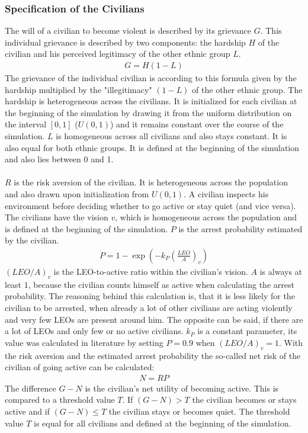 \documentclass[11pt]{article}
\begin{document}
\subsubsection{Specification of the Civilians}
The will of a civilian to become violent is described by its grievance $G$. This individual grievance is described by two components: the hardship $H$ of the civilian and his perceived legitimacy of the other ethnic group $L$.
\begin{align}
G = H (1 - L)
\end{align}
The grievance of the individual civilian is according to this formula given by the hardship multiplied by the "illegitimacy" $(1 - L)$ of the other ethnic group. The hardship is heterogeneous across the civilians. It is initialized for each civilian at the beginning of the simulation by drawing it from the uniform distribution on the interval $[0,1]$ ($U(0,1)$) and it remains constant over the course of the simulation. $L$ is homogeneous across all civilians and also stays constant. It is also equal for both ethnic groups. It is defined at the beginning of the simulation and also lies between 0 and 1.\\
\\
$R$ is the risk aversion of the civilian. It is heterogeneous across the population and also drawn upon initialization from $U(0,1)$. A civilian inspects his environment before deciding whether to go active or stay quiet (and vice versa). The civilians have the vision $v$, which is homogeneous across the population and is defined at the beginning of the simulation. $P$ is the arrest probability estimated by the civilian.
\begin{align}
P = 1 - \exp \left( - k_P \left( \frac{LEO}{A} \right)_v \right)
\end{align}
$\left(LEO/A\right)_v$ is the LEO-to-active ratio within the civilian's vision. $A$ is always at least $1$, because the civilian counts himself as active when calculating the arrest probability. The reasoning behind this calculation is, that it is less likely for the civilian to be arrested, when already a lot of other civilians are acting violently and very few LEOs are present around him. The opposite can be said, if there are a lot of LEOs and only few or no active civilians. $k_P$ is a constant parameter, its value was calculated in literature by setting $P = 0.9$ when $\left(LEO/A\right)_v = 1$. With the risk aversion and the estimated arrest probability the so-called net risk of the civilian of going active can be calculated:
\begin{align}
N = RP
\end{align}
The difference $G - N$ is the civilian's net utility of becoming active. This is compared to a threshold value $T$. If $(G - N) > T$ the civilian becomes or stays active and if $(G - N) \leq T$ the civilian stays or becomes quiet. The threshold value $T$ is equal for all civilians and defined at the beginning of the simulation.
\end{document}

